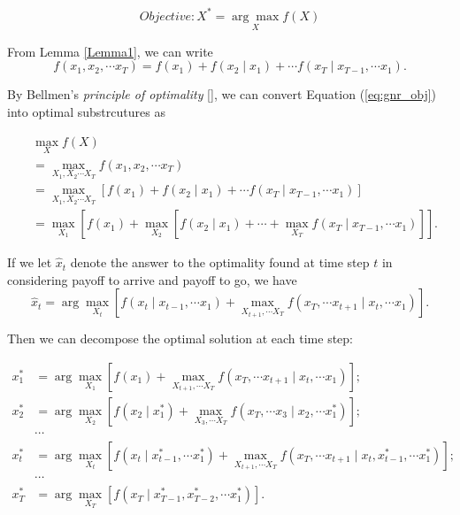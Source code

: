 \documentclass[12pt]{article}
\begin{document}
\begin{equation}
\label{eq:gnr_obj}
Objective: X^{*} = \underset{X}{\arg\max} f(X)
\end{equation}

From Lemma \ref{Lemma1}, we can write
\begin{equation}
\label{eq:gnr_f_chain}
f(x_{1}, x_{2}, \cdots x_{T}) = f(x_{1}) + f(x_{2} \mid x_{1}) + \cdots f(x_{T} \mid x_{T-1}, \cdots x_{1}).
\end{equation}

By Bellmen's \emph{principle of optimality} [\cite{lewis1986optimal}], we can convert Equation (\ref{eq:gnr_obj}) into optimal substrcutures as 

\begin{equation}
\label{eq:max_1}
\begin{aligned}
& \max_{X} f(X) \\
& = \max_{X_{1}, X_{2} \cdots X_{T}} f(x_{1}, x_{2}, \cdots x_{T}) \\
& = \max_{X_{1}, X_{2} \cdots X_{T}} \left[ f(x_{1}) + f(x_{2} \mid x_{1}) + \cdots f(x_{T} \mid x_{T-1}, \cdots x_{1}) \right] \\
& = \max_{X_{1}} \left[ f(x_{1}) + \max_{X_{2}} \left[ f(x_{2} \mid x_{1}) + \cdots + \max_{X_{T}} f(x_{T} \mid x_{T-1}, \cdots x_{1}) \right] \right].
\end{aligned}
\end{equation}

If we let $ \hat{x}_{t} $ denote the answer to the optimality found at time step $ t $ in considering payoff to arrive and payoff to go, we have 
\begin{equation}
\label{eq:max_2}
\hat{x}_{t} = \arg \max_{X_{t}} \left[ f(x_{t} \mid x_{t-1}, \cdots x_{1})
+ \max_{X_{t+1}, \cdots X_{T}} f(x_{T}, \cdots x_{t+1} \mid x_{t}, \cdots x_{1})
\right].
\end{equation}

Then we can decompose the optimal solution at each time step:

\begin{equation}
\label{eq:max_3}
\begin{aligned}
x_{1}^{*} & = \arg \max_{X_{1}} \left[ f(x_{1}) + \max_{X_{t+1}, \cdots X_{T}} f(x_{T}, \cdots x_{t+1} \mid x_{t}, \cdots x_{1})  \right]; \\
x_{2}^{*} & = \arg \max_{X_{2}} \left[ f(x_{2} \mid x_{1}^{*}) + \max_{X_{3}, \cdots X_{T}} f(x_{T}, \cdots x_{3} \mid x_{2}, \cdots x_{1}^{*})  \right]; \\
& \cdots \\
x_{t}^{*} & = \arg \max_{X_{t}} \left[ f(x_{t} \mid x_{t-1}^{*}, \cdots x_{1}^{*}) + \max_{X_{t+1}, \cdots X_{T}} f(x_{T}, \cdots x_{t+1} \mid x_{t},  x_{t-1}^{*}, \cdots x_{1}^{*}) \right]; \\
& \cdots \\
x_{T}^{*} & = \arg \max_{X_{T}} \left[ f(x_{T} \mid x_{T-1}^{*}, x_{T-2}^{*}, \cdots x_{1}^{*})\right].
\end{aligned}
\end{equation}
\end{document}
